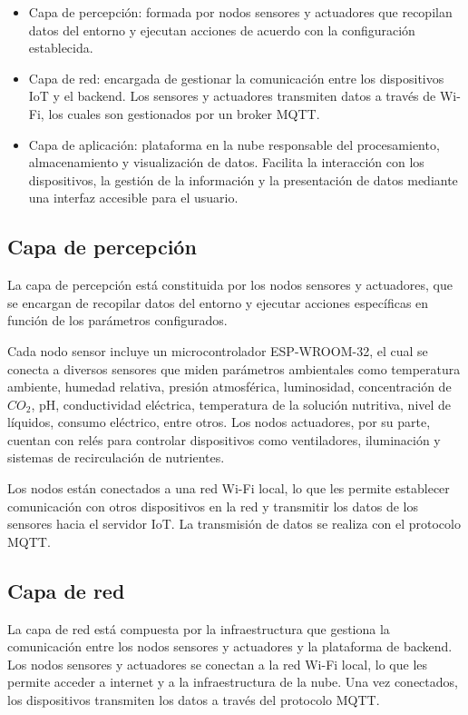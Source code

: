 \begin{itemize}
    \item Capa de percepción: formada por nodos sensores y actuadores que recopilan datos
          del entorno y ejecutan acciones de acuerdo con la configuración establecida.
    \item Capa de red: encargada de gestionar la comunicación entre los dispositivos IoT
          y el backend. Los sensores y actuadores transmiten datos a través de Wi-Fi, los
          cuales son gestionados por un broker MQTT.
    \item Capa de aplicación: plataforma en la nube responsable del procesamiento,
          almacenamiento y visualización de datos. Facilita la interacción con los
          dispositivos, la gestión de la información y la presentación de datos mediante
          una interfaz accesible para el usuario.
\end{itemize}

\subsection{Capa de percepción}

La capa de percepción está constituida por los nodos sensores y actuadores, que
se encargan de recopilar datos del entorno y ejecutar acciones específicas en
función de los parámetros configurados.

Cada nodo sensor incluye un microcontrolador ESP-WROOM-32, el cual se conecta a
diversos sensores que miden parámetros ambientales como temperatura ambiente,
humedad relativa, presión atmosférica, luminosidad, concentración de $CO_2$,
pH, conductividad eléctrica, temperatura de la solución nutritiva, nivel de
líquidos, consumo eléctrico, entre otros. Los nodos actuadores, por su parte,
cuentan con relés para controlar dispositivos como ventiladores, iluminación y
sistemas de recirculación de nutrientes.

Los nodos están conectados a una red Wi-Fi local, lo que les permite establecer
comunicación con otros dispositivos en la red y transmitir los datos de los
sensores hacia el servidor IoT. La transmisión de datos se realiza con el
protocolo MQTT.

\subsection{Capa de red}

La capa de red está compuesta por la infraestructura que gestiona la
comunicación entre los nodos sensores y actuadores y la plataforma de backend.
Los nodos sensores y actuadores se conectan a la red Wi-Fi local, lo que les
permite acceder a internet y a la infraestructura de la nube. Una vez
conectados, los dispositivos transmiten los datos a través del protocolo MQTT.

